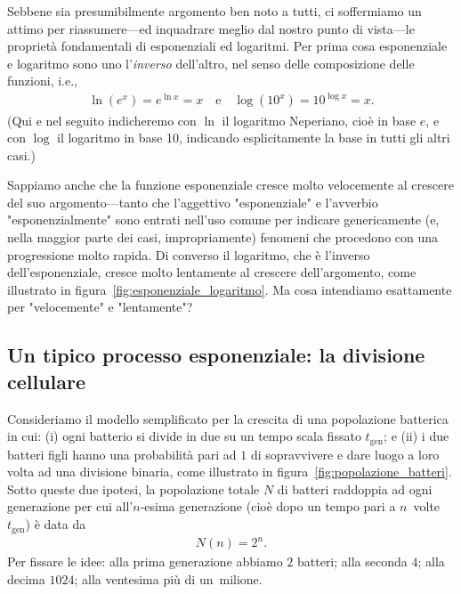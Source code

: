 Sebbene sia presumibilmente argomento ben noto a tutti, ci soffermiamo un attimo
per riassumere---ed inquadrare meglio dal nostro punto di vista---le
proprietà fondamentali di esponenziali ed logaritmi.
Per prima cosa esponenziale e logaritmo sono uno
l'\emph{inverso} dell'altro, nel senso delle composizione delle funzioni, i.e.,
\begin{align*}
  \ln\left(e^x\right) = e^{\ln x} = x \quad \text{e} \quad
  \log\left(10^x\right) = 10^{\log x} = x.
\end{align*}
(Qui e nel seguito indicheremo con $\ln$ il logaritmo Neperiano, cioè in base
$e$, e con $\log$ il logaritmo in base 10, indicando esplicitamente la base in
tutti gli altri casi.)


Sappiamo anche che la funzione esponenziale cresce molto velocemente al crescere
del suo argomento---tanto che l'aggettivo "esponenziale" e l'avverbio
"esponenzialmente" sono entrati nell'uso comune per indicare genericamente
(e, nella maggior parte dei casi, impropriamente) fenomeni che procedono con
una progressione molto rapida. Di converso il logaritmo, che è l'inverso
dell'esponenziale, cresce molto lentamente al crescere dell'argomento,
come illustrato in figura~\ref{fig:esponenziale_logaritmo}. Ma cosa intendiamo
esattamente per "velocemente" e "lentamente"?


\subsection{Un tipico processo esponenziale: la divisione cellulare}

Consideriamo il modello semplificato per la crescita di una popolazione
batterica in cui: (i) ogni batterio si divide in due su un tempo scala fissato
$t_\text{gen}$; e (ii) i due batteri figli hanno una probabilità pari ad $1$ di
sopravvivere e dare luogo a loro volta ad una divisione binaria, come
illustrato in figura~\ref{fig:popolazione_batteri}.
Sotto queste due ipotesi, la popolazione totale $N$ di batteri raddoppia ad
ogni generazione per cui all'$n$-esima generazione (cioè dopo un tempo pari
a $n$~volte $t_\text{gen}$) è data da
\begin{align}\label{eq:crescita_batteri}
  N(n) = 2^n.
\end{align}
Per fissare le idee: alla prima generazione abbiamo $2$ batteri; alla seconda
$4$; alla decima $1024$; alla ventesima più di un~milione.

